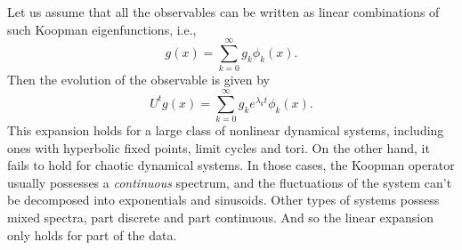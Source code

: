\documentclass{article}
\begin{document}
Let us assume that all the observables can be written as linear combinations of
such Koopman eigenfunctions, i.e.,
\begin{equation}
    g(x) = \sum_{k=0}^{\infty}g_k \phi_k(x).
\end{equation}
Then the evolution of the observable is given by
\begin{equation}
    U^t g(x) = \sum_{k=0}^{\infty}g_k e^{\lambda_k t} \phi_k(x).
\end{equation}
This expansion holds for a large class of nonlinear dynamical systems,
including ones with hyperbolic fixed points, limit cycles and tori.
On the other hand, it fails to hold for chaotic dynamical systems.
In those cases, the Koopman operator usually possesses a \textit{continuous}
spectrum, and the fluctuations of the system can't be decomposed into
exponentials and sinusoids.
Other types of systems possess mixed spectra, part discrete and part continuous.
And so the linear expansion only holds for part of the data.
\end{document}

